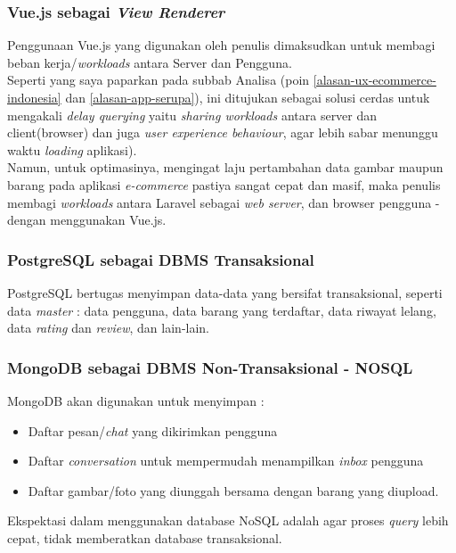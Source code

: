     \subsubsection{\textbf{Vue.js sebagai \textit{View Renderer} }}
	Penggunaan Vue.js yang digunakan oleh penulis dimaksudkan untuk membagi beban kerja/\textit{workloads} antara Server dan Pengguna. \\
    Seperti yang saya paparkan pada subbab Analisa (poin \ref{alasan-ux-ecommerce-indonesia} dan \ref{alasan-app-serupa}), ini ditujukan sebagai solusi cerdas untuk mengakali \textit{delay querying} yaitu \textit{sharing workloads} antara server dan client(browser) dan juga \textit{user experience behaviour}, agar lebih sabar menunggu waktu \textit{loading} aplikasi). \\
    Namun, untuk optimasinya, mengingat laju pertambahan data gambar maupun barang pada aplikasi \textit{e-commerce} pastiya sangat cepat dan masif, maka penulis membagi \textit{workloads} antara Laravel sebagai \textit{web server}, dan browser pengguna - dengan menggunakan Vue.js.
    
    
    \subsubsection{\textbf{PostgreSQL sebagai DBMS Transaksional}}
    PostgreSQL bertugas menyimpan data-data yang bersifat transaksional, seperti data \textit{master} : data pengguna, data barang yang terdaftar, data riwayat lelang, data \textit{rating} dan \textit{review}, dan lain-lain.
    
    \subsubsection{\textbf{MongoDB} sebagai DBMS Non-Transaksional - NOSQL}
    MongoDB akan digunakan untuk menyimpan :
	    \begin{itemize}[noitemsep,topsep=0pt]
	    \item Daftar pesan/\textit{chat} yang dikirimkan pengguna
	    \item Daftar \textit{conversation} untuk mempermudah menampilkan \textit{inbox} pengguna
	    \item Daftar gambar/foto yang diunggah bersama dengan barang yang diupload.
	    \end{itemize}
	Ekspektasi dalam menggunakan database NoSQL adalah agar proses \textit{query} lebih cepat, tidak memberatkan database transaksional.


